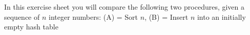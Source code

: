 In this exercise sheet you will compare the following two procedures,
given a sequence of $n$ integer numbers:
(A) = Sort $n$,
(B) = Insert $n$ into an initially empty hash table